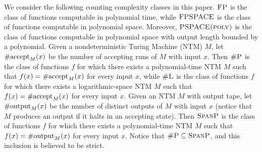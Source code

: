 We consider the following counting complexity classes in this paper. 
$\text{\sc FP}$ is the class of functions computable in polynomial time, while $\text{\sc FPSPACE}$ is the class of functions computable in polynomial space. Moreover, $\text{\sc PSPACE(poly)}$ is the class of functions computable in polynomial space with output length bounded by a polynomial. Given a nondeterministic Turing Machine (NTM) $M$, let $\text{\rm \#accept}_M(x)$ be the number of accepting runs of $M$ with input $x$. Then $\text{\sc \#P}$ is the class of functions $f$ for which there exists a polynomial-time NTM $M$ such that $f(x) = \text{\rm \#accept}_M(x)$ for every input $x$, while $\text{\sc \#L}$ is the class of functions $f$ for which there exists a logarithmic-space NTM $M$ such that $f(x) = \text{\rm \#accept}_M(x)$ for every input $x$.  Given an NTM $M$ with output tape, let $\text{\rm \#output}_M(x)$ be the number of distinct outputs of $M$ with input $x$ (notice that  $M$ produces an output if it halts in an accepting state). Then $\text{\sc SpanP}$ is the  class of functions $f$ for which there exists a polynomial-time NTM $M$ such that $f(x) = \text{\rm \#output}_M(x)$ for every input $x$. Notice that $\text{\sc \#P} \subseteq \text{\sc SpanP}$, and this inclusion is believed to be strict. 



